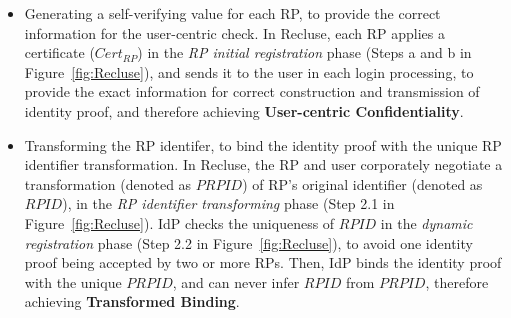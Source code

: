 \begin{itemize}
 \item Generating a self-verifying value for each RP, to provide the correct information for the user-centric check.
  In Recluse, each RP applies a certificate ($Cert_{RP}$) in the \emph{RP initial registration} phase (Steps a and b in Figure~\ref{fig:Recluse}),
  and sends it to the user in each login processing,
  to provide the exact information for  correct construction and transmission of identity proof,
             and therefore achieving \textbf{User-centric Confidentiality}.




    \item Transforming the RP identifer, to bind the identity proof with the unique RP identifier transformation.  
  In Recluse, the RP and user corporately negotiate a transformation (denoted as $PRPID$) of RP's original identifier (denoted as $RPID$), in the \emph{RP identifier transforming} phase (Step 2.1 in Figure~\ref{fig:Recluse}). 
  IdP checks the uniqueness of $RPID$ in the \emph{dynamic registration} phase (Step 2.2 in Figure~\ref{fig:Recluse}),  to avoid one identity proof being accepted by two or more RPs.
  Then, IdP  binds the identity proof with the unique $PRPID$, and  can never infer $RPID$ from $PRPID$, 
   therefore achieving \textbf{Transformed Binding}.
  

\end{itemize}
